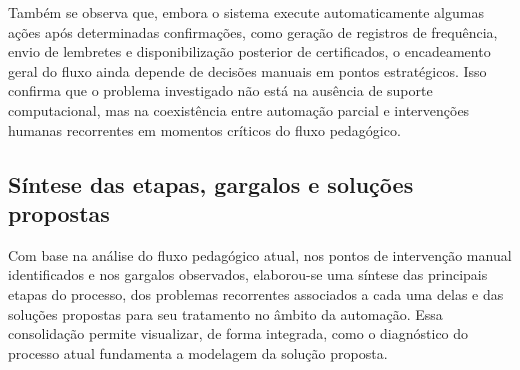 Também se observa que, embora o sistema execute automaticamente algumas
ações após determinadas confirmações, como geração de registros de
frequência, envio de lembretes e disponibilização posterior de
certificados, o encadeamento geral do fluxo ainda depende de decisões
manuais em pontos estratégicos. Isso confirma que o problema investigado
não está na ausência de suporte computacional, mas na coexistência entre
automação parcial e intervenções humanas recorrentes em momentos críticos
do fluxo pedagógico.

\subsection{Síntese das etapas, gargalos e soluções propostas}
\label{sec:metod:etapas:sintese-gargalos}

Com base na análise do fluxo pedagógico atual, nos pontos de intervenção
manual identificados e nos gargalos observados, elaborou-se uma síntese
das principais etapas do processo, dos problemas recorrentes associados
a cada uma delas e das soluções propostas para seu tratamento no âmbito
da automação. Essa consolidação permite visualizar, de forma integrada,
como o diagnóstico do processo atual fundamenta a modelagem da solução
proposta.

